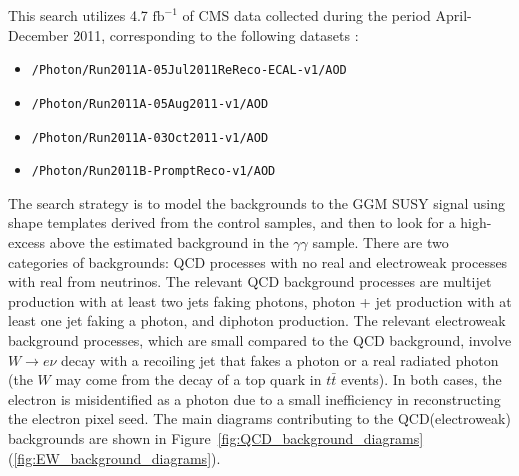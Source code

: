 \documentclass[dissertation_bw.tex]{subfiles}
\begin{document}
This search utilizes 4.7 $\mbox{fb}^{-1}$ of CMS data collected during the period April-December 2011, corresponding to the following datasets \cite{DAS}:

\begin{itemize}
\item \verb+/Photon/Run2011A-05Jul2011ReReco-ECAL-v1/AOD+
\item \verb+/Photon/Run2011A-05Aug2011-v1/AOD+
\item \verb+/Photon/Run2011A-03Oct2011-v1/AOD+
\item \verb+/Photon/Run2011B-PromptReco-v1/AOD+
\end{itemize}

The search strategy is to model the backgrounds to the GGM SUSY signal using \MET shape templates derived from the control samples, and then to look for a high-\MET excess above the estimated background in the $\gamma\gamma$ sample.  There are two categories of backgrounds: QCD processes with no real \MET and electroweak processes with real \MET from neutrinos.  The relevant QCD background processes are multijet production with at least two jets faking photons, photon + jet production with at least one jet faking a photon, and diphoton production.  The relevant electroweak background processes, which are small compared to the QCD background, involve $W\rightarrow e\nu$ decay with a recoiling jet that fakes a photon or a real radiated photon (the $W$ may come from the decay of a top quark in $t\bar{t}$ events).  In both cases, the electron is misidentified as a photon due to a small inefficiency in reconstructing the electron pixel seed.  The main diagrams contributing to the QCD(electroweak) backgrounds are shown in Figure~\ref{fig:QCD_background_diagrams}(\ref{fig:EW_background_diagrams}).
\end{document}
